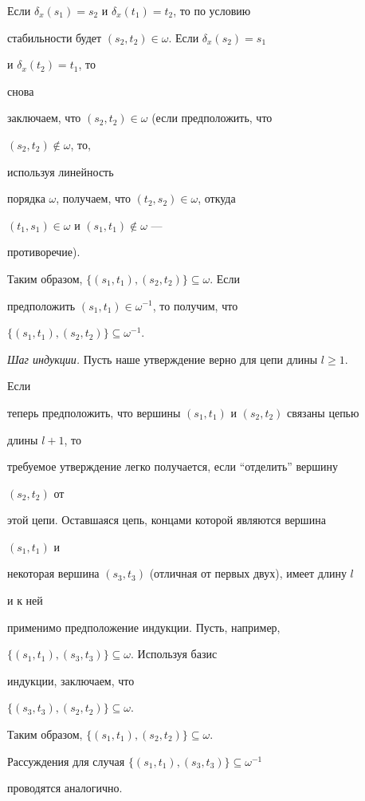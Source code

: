 \begin{pf}
Если $\delta_x(s_1)=s_2$ и $\delta_x(t_1)=t_2$, то по условию


стабильности будет $(s_2,t_2)\in\omega$. Если $\delta_x(s_2)=s_1$


и $\delta_x(t_2)=t_1$, то


снова


заключаем, что $(s_2,t_2)\in\omega$ (если предположить, что


$(s_2,t_2)\notin\omega$, то,


используя линейность


порядка $\omega$, получаем, что $(t_2,s_2)\in\omega$, откуда


$(t_1,s_1)\in\omega$ и $(s_1,t_1)\notin\omega$ ---


противоречие).


Таким образом, $\{(s_1,t_1),(s_2,t_2)\}\subseteq\omega$. Если


предположить $(s_1,t_1)\in\omega^{-1}$, то получим, что


$\{(s_1,t_1),(s_2,t_2)\}\subseteq\omega^{-1}$.





{\em Шаг индукции.} Пусть наше утверждение верно для цепи длины $l\ge 1$.


Если


теперь предположить, что вершины $(s_1,t_1)$ и $(s_2,t_2)$ связаны цепью


длины $l+1$, то


требуемое утверждение легко получается, если ``отделить'' вершину


$(s_2,t_2)$ от


этой цепи. Оставшаяся цепь, концами которой являются вершина


$(s_1,t_1)$ и


некоторая вершина $(s_3,t_3)$ (отличная от первых двух), имеет длину $l$


и к ней


применимо предположение индукции. Пусть, например,


$\{(s_1,t_1),(s_3,t_3)\}\subseteq\omega$. Используя базис


индукции, заключаем, что


$\{(s_3,t_3),(s_2,t_2)\}\subseteq\omega$.


Таким образом, $\{(s_1,t_1),(s_2,t_2)\}\subseteq\omega$.


Рассуждения для случая $\{(s_1,t_1),(s_3,t_3)\}\subseteq\omega^{-1}$


проводятся аналогично.






\end{pf}
